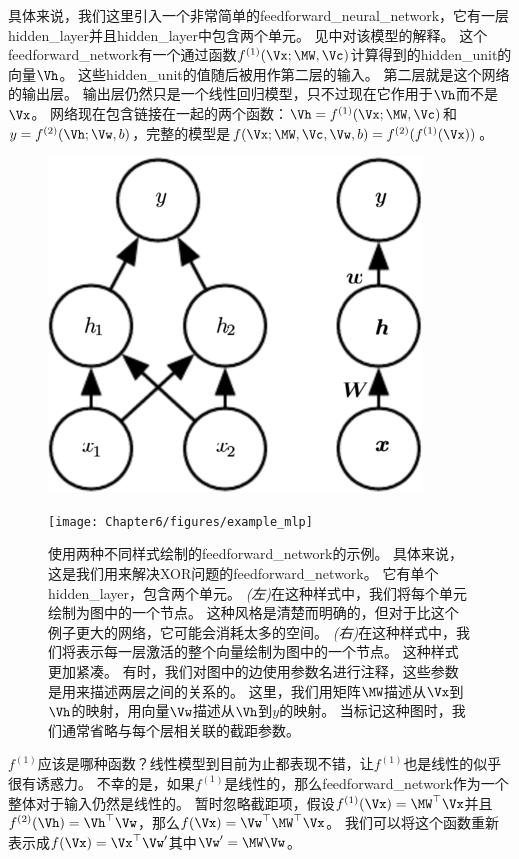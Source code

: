 具体来说，我们这里引入一个非常简单的\gls{feedforward_neural_network}，它有一层\gls{hidden_layer}并且\gls{hidden_layer}中包含两个单元。
见中对该模型的解释。
这个\gls{feedforward_network}有一个通过函数$f^{(1)}(\Vx;\MW, \Vc)$计算得到的\gls{hidden_unit}的向量$\Vh$。
这些\gls{hidden_unit}的值随后被用作第二层的输入。
第二层就是这个网络的输出层。
输出层仍然只是一个线性回归模型，只不过现在它作用于$\Vh$而不是$\Vx$。
网络现在包含链接在一起的两个函数：$\Vh=f^{(1)}(\Vx; \MW, \Vc)$和$y = f^{(2)}(\Vh; \Vw, b)$，完整的模型是$f(\Vx; \MW, \Vc, \Vw, b) = f^{(2)}(f^{(1)}(\Vx))$。
\begin{figure}[!htb]
\ifOpenSource
\centerline{\includegraphics[scale=0.5]{images/44.png}}
\else
\centerline{\texttt{[image: Chapter6/figures/example\_mlp]}}
\fi
\captionsetup{singlelinecheck=off}
\caption{使用两种不同样式绘制的\gls{feedforward_network}的示例。
具体来说，这是我们用来解决XOR问题的\gls{feedforward_network}。
它有单个\gls{hidden_layer}，包含两个单元。
\emph{(左)}在这种样式中，我们将每个单元绘制为图中的一个节点。
这种风格是清楚而明确的，但对于比这个例子更大的网络，它可能会消耗太多的空间。
\emph{(右)}在这种样式中，我们将表示每一层激活的整个向量绘制为图中的一个节点。
这种样式更加紧凑。
有时，我们对图中的边使用参数名进行注释，这些参数是用来描述两层之间的关系的。
这里，我们用矩阵$\MW$描述从$\Vx$到$\Vh$的映射，用向量$\Vw$描述从$\Vh$到$y$的映射。
当标记这种图时，我们通常省略与每个层相关联的截距参数。}
\label{fig:chap6_example_mlp}
\end{figure}


$f^{(1)}$应该是哪种函数？线性模型到目前为止都表现不错，让$f^{(1)}$也是线性的似乎很有诱惑力。
不幸的是，如果$f^{(1)}$是线性的，那么\gls{feedforward_network}作为一个整体对于输入仍然是线性的。
暂时忽略截距项，假设$f^{(1)}(\Vx)= \MW^\top \Vx$并且$f^{(2)}(\Vh)=\Vh^\top \Vw$，那么$f(\Vx) = \Vw^\top\MW^\top \Vx$。
我们可以将这个函数重新表示成$f(\Vx) = \Vx^\top\Vw'$其中$\Vw' = \MW\Vw$。

